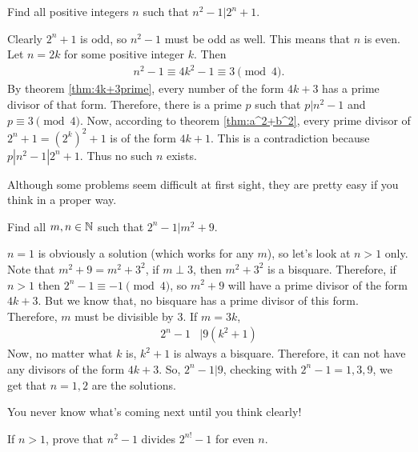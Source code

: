 \documentclass[problems.tex]{subfile}
\begin{document}
	\begin{problem}
		Find all positive integers $n$ such that $n^2-1|2^n+1$.
	\end{problem}
	
	\begin{solution}
		Clearly $2^n+1$ is odd, so $n^2-1$ must be odd as well. This means that $n$ is even. Let $n=2k$ for some positive integer $k$. Then
			\begin{align*}
				n^2-1 \equiv 4k^2 - 1 \equiv 3 \pmod 4.
			\end{align*}
		By theorem \eqref{thm:4k+3prime}, every number of the form $4k+3$ has a prime divisor of that form. Therefore, there is a prime $p$ such that $p|n^2-1$ and $p \equiv 3 \pmod 4$. Now, according to theorem \eqref{thm:a^2+b^2}, every prime divisor of $2^{n}+1=\left(2^{k}\right)^2 + 1$ is of the form $4k+1$. This is a contradiction because $p|n^2-1|2^n+1$. Thus no such $n$ exists.
	\end{solution}
	
	\begin{note}
		Although some problems seem difficult at first sight, they are pretty easy if you think in a proper way. 
	\end{note}
	
	\begin{problem}
		Find all $m,n\in\mathbb{N}$ such that $2^n-1|m^2+9$.
	\end{problem}
	
	\begin{solution}
		$n=1$ is obviously a solution (which works for any $m$), so let's look at $n>1$ only. Note that $m^2+9=m^2+3^2$, if $m\perp3$, then $m^2+3^2$ is a bisquare. Therefore, if $n>1$ then $2^n-1\equiv-1\pmod4$, so $m^2+9$ will have a prime divisor of the form $4k+3$. But we know that, no bisquare has a prime divisor of this form. Therefore, $m$ must be divisible by $3$. If $m=3k$,
		\begin{align*}
		2^n-1 & |9(k^2+1)
		\end{align*}
		Now, no matter what $k$ is, $k^2+1$ is always a bisquare. Therefore, it can not have any divisors of the form $4k+3$. So, $2^n-1|9$, checking with $2^n-1=1,3,9$, we get that $n=1,2$ are the solutions.
	\end{solution}
You never know what's coming next until you think clearly!	
	\begin{problem}
		If $n>1$, prove that $n^2-1$ divides $2^{n!}-1$ for even $n$.
	\end{problem}
	
\end{document}

